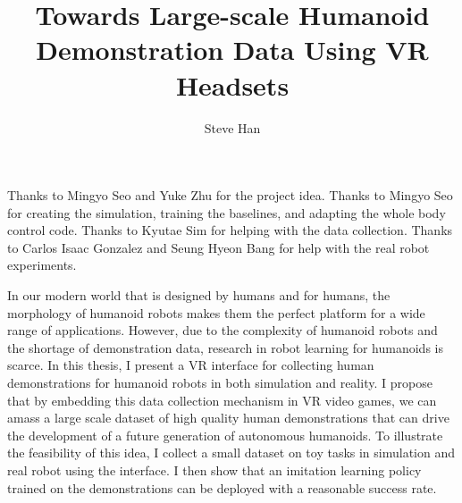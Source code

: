 \documentclass[12pt]{report}	%
\author{Steve Han}  	%
\title{Towards Large-scale Humanoid Demonstration Data Using VR Headsets}
\theoremstyle{definition}
\theoremstyle{remark}
\begin{document}
%
%
%
\commcertpage           %

\titlepage              %




\begin{acknowledgments}		%
%
Thanks to Mingyo Seo and Yuke Zhu for the project idea. 
Thanks to Mingyo Seo for creating the simulation, training the baselines, and adapting the whole body control code.
Thanks to Kyutae Sim for helping with the data collection.
Thanks to Carlos Isaac Gonzalez and Seung Hyeon Bang for help with the real robot experiments.
\end{acknowledgments}


%
\utabstract
{}%
\indent
In our modern world that is designed by humans and for humans, the morphology of humanoid robots makes them the perfect platform for a wide range of applications. However, due to the complexity of humanoid robots and the shortage of demonstration data, research in robot learning for humanoids is scarce. In this thesis, I present a VR interface for collecting human demonstrations for humanoid robots in both simulation and reality. I propose that by embedding this data collection mechanism in VR video games, we can amass a large scale dataset of high quality human demonstrations that can drive the development of a future generation of autonomous humanoids. To illustrate the feasibility of this idea, I collect a small dataset on toy tasks in simulation and real robot using the interface. I then show that an imitation learning policy trained on the demonstrations can be deployed with a reasonable success rate.


\tableofcontents   %
\end{document}

